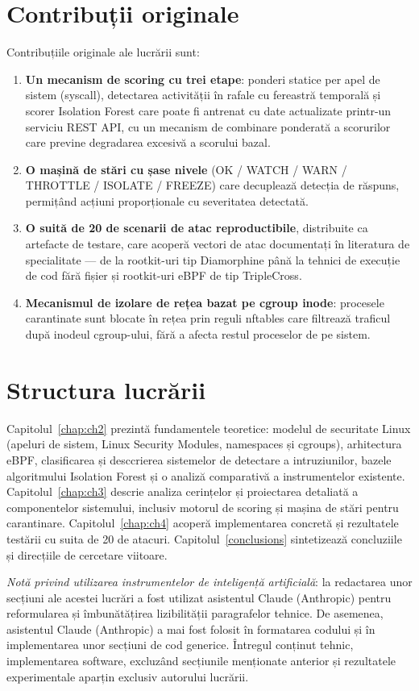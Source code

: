 \section{Contribuții originale}

\par Contribuțiile originale ale lucrării sunt:

\begin{enumerate}
    \item \textbf{Un mecanism de scoring cu trei etape}: ponderi statice per apel de sistem (syscall), detectarea activității în rafale cu fereastră temporală și scorer Isolation Forest care poate fi antrenat cu date actualizate printr-un serviciu REST API, cu un mecanism de combinare ponderată a scorurilor care previne degradarea excesivă a scorului bazal.
    \item \textbf{O mașină de stări cu șase nivele} (OK / WATCH / WARN / THROTTLE / ISOLATE / FREEZE) care decuplează detecția de răspuns, permițând acțiuni proporționale cu severitatea detectată.
    \item \textbf{O suită de 20 de scenarii de atac reproductibile}, distribuite ca artefacte de testare, care acoperă vectori de atac documentați în literatura de specialitate — de la rootkit-uri tip Diamorphine până la tehnici de execuție de cod fără fișier și rootkit-uri eBPF de tip TripleCross.
    \item \textbf{Mecanismul de izolare de rețea bazat pe cgroup inode}: procesele carantinate sunt blocate în rețea prin reguli nftables care filtrează traficul după inodeul cgroup-ului, fără a afecta restul proceselor de pe sistem.
\end{enumerate}


\section{Structura lucrării}

\par Capitolul~\ref{chap:ch2} prezintă fundamentele teoretice: modelul de securitate Linux (apeluri de sistem, Linux Security Modules, namespaces și cgroups), arhitectura eBPF, clasificarea și desccrierea sistemelor de detectare a intruziunilor, bazele algoritmului Isolation Forest și o analiză comparativă a instrumentelor existente. Capitolul~\ref{chap:ch3} descrie analiza cerințelor și proiectarea detaliată a componentelor sistemului, inclusiv motorul de scoring și mașina de stări pentru carantinare. Capitolul~\ref{chap:ch4} acoperă implementarea concretă și rezultatele testării cu suita de 20 de atacuri. Capitolul~\ref{conclusions} sintetizează concluziile și direcțiile de cercetare viitoare.

\par \textit{Notă privind utilizarea instrumentelor de inteligență artificială}: la redactarea unor secțiuni ale acestei lucrări a fost utilizat asistentul Claude (Anthropic) pentru reformularea și îmbunătățirea lizibilității paragrafelor tehnice. De asemenea, asistentul Claude (Anthropic) a mai fost folosit în formatarea codului și în implementarea unor secțiuni de cod generice. Întregul conținut tehnic, implementarea software, excluzând secțiunile menționate anterior și rezultatele experimentale aparțin exclusiv autorului lucrării.

